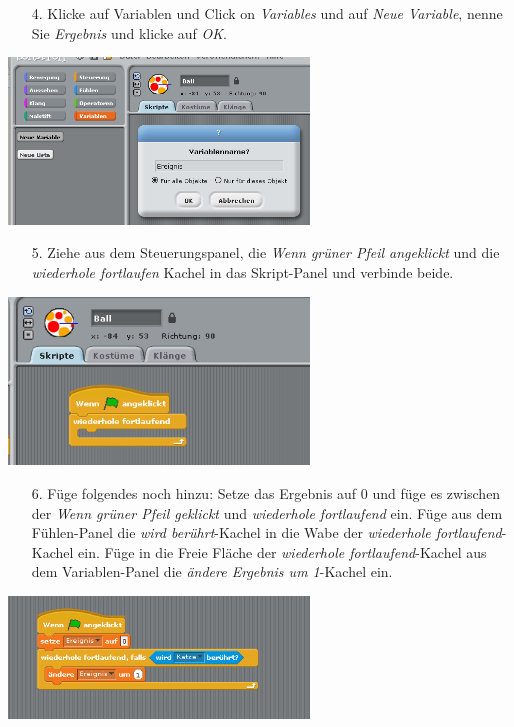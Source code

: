 \begin{itemize}
\item[4.] Klicke auf Variablen und Click on \textit{Variables} und auf \textit{Neue Variable}, nenne Sie \textit{Ergebnis} und klicke auf \textit{OK}.
\end{itemize}
\includegraphics[width=0.6\textwidth]{images/aufgabe3_variable.png}
\begin{itemize}
\item[5.] Ziehe aus dem Steuerungspanel, die \textit{Wenn grüner Pfeil angeklickt} und die \textit{wiederhole fortlaufen} Kachel in das Skript-Panel und verbinde beide.
\end{itemize}
\includegraphics[width=0.6\textwidth]{images/aufgabe3_ball1.png}
\begin{itemize}
\item[6.] Füge folgendes noch hinzu:
\subitem Setze das Ergebnis auf 0 und füge es zwischen der \textit{Wenn grüner Pfeil geklickt} und \textit{wiederhole fortlaufend} ein.
\subitem Füge aus dem Fühlen-Panel die \textit{wird berührt}-Kachel in die Wabe der \textit{wiederhole fortlaufend}-Kachel ein.
\subitem Füge in die Freie Fläche der \textit{wiederhole fortlaufend}-Kachel aus dem Variablen-Panel die \textit{ändere Ergebnis um 1}-Kachel ein.
\end{itemize}
\includegraphics[width=0.6\textwidth]{images/aufgabe3_ball2.png}
